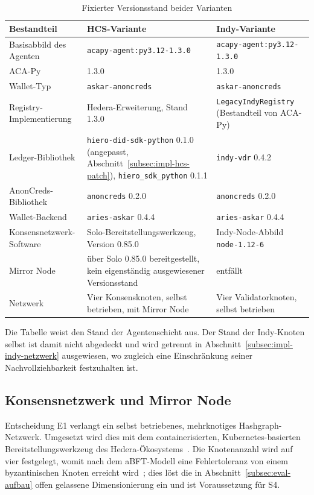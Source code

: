 \begin{table}[htbp]
\renewcommand{\arraystretch}{1.3}
\footnotesize
  \centering
  \caption{Fixierter Versionsstand beider Varianten}
  \label{tab:impl-versionsstand}
  \begin{tabular}{p{} p{} p{}}
    \toprule
    \textbf{Bestandteil} & \textbf{HCS-Variante} & \textbf{Indy-Variante} \\
    \midrule
    Basisabbild des Agenten & \texttt{acapy-agent:py3.12-1.3.0} & \texttt{acapy-agent:py3.12-1.3.0} \\
    ACA-Py & 1.3.0 & 1.3.0 \\
    Wallet-Typ & \texttt{askar-anoncreds} & \texttt{askar-anoncreds} \\
    Registry-Implementierung & Hedera-Erweiterung, Stand 1.3.0~\cite{acapyhedera} & \texttt{LegacyIndyRegistry} (Bestandteil von ACA-Py) \\
    Ledger-Bibliothek & \texttt{hiero-did-sdk-python} 0.1.0 (angepasst, Abschnitt~\ref{subsec:impl-hcs-patch}), \texttt{hiero\_sdk\_python} 0.1.1 & \texttt{indy-vdr} 0.4.2 \\
    AnonCreds-Bibliothek & \texttt{anoncreds} 0.2.0 & \texttt{anoncreds} 0.2.0 \\
    Wallet-Backend & \texttt{aries-askar} 0.4.4 & \texttt{aries-askar} 0.4.4 \\
    Konsensnetzwerk-Software & Solo-Bereitstellungswerkzeug, Version 0.85.0 & Indy-Node-Abbild \texttt{node-1.12-6} \\
    Mirror Node & über Solo 0.85.0 bereitgestellt, kein eigenständig ausgewiesener Versionsstand & entfällt \\
    Netzwerk & Vier Konsensknoten, selbst betrieben, mit Mirror Node & Vier Validatorknoten, selbst betrieben \\
    \bottomrule
  \end{tabular}
\end{table}
Die Tabelle weist den Stand der Agentenschicht aus. Der Stand der Indy-Knoten selbst ist damit nicht abgedeckt und wird getrennt in Abschnitt~\ref{subsec:impl-indy-netzwerk} ausgewiesen, wo zugleich eine Einschränkung seiner Nachvollziehbarkeit festzuhalten ist.


\subsection{Konsensnetzwerk und Mirror Node}
\label{subsec:impl-hcs-netzwerk}

Entscheidung E1 verlangt ein selbst betriebenes, mehrknotiges Hashgraph-Netzwerk. Umgesetzt wird dies mit dem containerisierten, Kubernetes-basierten Bereitstellungswerkzeug des Hedera-Ökosystems~\cite{hierosolo}. Die Knotenanzahl wird auf vier festgelegt, womit nach dem aBFT-Modell eine Fehlertoleranz von einem byzantinischen Knoten erreicht wird~\cite{bairdgross2019}; dies löst die in Abschnitt~\ref{subsec:eval-aufbau} offen gelassene Dimensionierung ein und ist Voraussetzung für S4.

